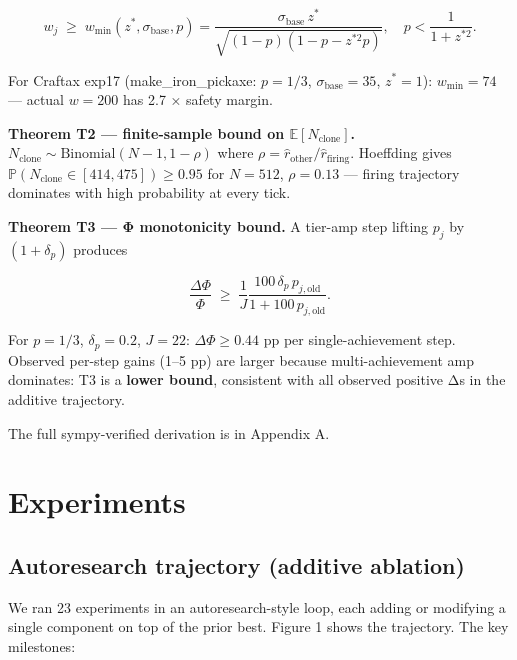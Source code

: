 \documentclass[11pt,letterpaper]{article}
\begin{document}
\[
w_j \;\ge\; w_{\min}(z^*, \sigma_{\text{base}}, p)
= \frac{\sigma_{\text{base}} \, z^*}{\sqrt{(1-p)(1 - p - z^{*2} p)}},
\quad p < \frac{1}{1 + z^{*2}}.
\]

For Craftax exp17 (make\_iron\_pickaxe: $p = 1/3$, $\sigma_{\text{base}} = 35$,
$z^* = 1$): $w_{\min} = 74$ — actual $w = 200$ has 2.7 × safety margin.

\textbf{Theorem T2 — finite-sample bound on $\mathbb{E}[N_{\text{clone}}]$.}
$N_{\text{clone}} \sim \mathrm{Binomial}(N-1, 1-\rho)$ where
$\rho = \widehat{r}_{\text{other}}/\widehat{r}_{\text{firing}}$.
Hoeffding gives $\mathbb{P}(N_{\text{clone}} \in [414, 475]) \ge 0.95$
for $N = 512$, $\rho = 0.13$ — firing trajectory dominates with
high probability at every tick.

\textbf{Theorem T3 — Φ monotonicity bound.} A tier-amp step lifting $p_j$ by
$(1 + \delta_p)$ produces

\[
\frac{\Delta \Phi}{\Phi} \;\ge\; \frac{1}{J}
\frac{100 \, \delta_p \, p_{j,\text{old}}}{1 + 100 \, p_{j,\text{old}}}.
\]

For $p = 1/3$, $\delta_p = 0.2$, $J = 22$: $\Delta\Phi \ge 0.44$ pp per
single-achievement step. Observed per-step gains (1–5 pp) are larger
because multi-achievement amp dominates: T3 is a \textbf{lower bound},
consistent with all observed positive Δs in the additive trajectory.

The full sympy-verified derivation is in Appendix A.



\section{Experiments}

\subsection{Autoresearch trajectory (additive ablation)}

We ran 23 experiments in an autoresearch-style loop, each adding or
modifying a single component on top of the prior best. Figure 1 shows
the trajectory. The key milestones:
\end{document}
